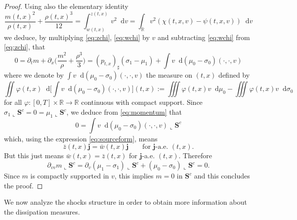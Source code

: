 \documentclass[11pt, twoside, reqno]{amsart}
\theoremstyle{definition}
\theoremstyle{remark}
\numberwithin{equation}{section}
\newcommand*\dif{\mathop{}\!\mathrm{d}}
\begin{document}
\begin{proof}
Using also the elementary identity 
$$
\frac{m(t,x)^2}{\rho(t,x)} + \frac{\rho(t,x)^3}{12} = \int_{w(t,x)}^{z(t,x)}v^2 \dif v = \int_{\mathbb R} v^2 (\chi(t,x,v) - \psi(t,x,v)) \dif v
$$
we deduce, by multiplying \eqref{eq:zchi}, \eqref{eq:wchi} by $v$ and subtracting \eqref{eq:wchi} from \eqref{eq:zchi}, that 
\begin{equation}\label{eq:momentum}
    0 = \partial_t m + \partial_x \Big(\frac{m^2}{\rho} + \frac{\rho^3}{3}\Big) = (p_{t,x})_\sharp (\sigma_1 - \mu_1) + \int  v \dif (\mu_0- \sigma_0)(\cdot,\cdot, v)
\end{equation}
where  we denote by $\int  v \dif (\mu_0- \sigma_0)(\cdot,\cdot, v)$ the measure on $(t,x)$ defined by 
$$
\iint \varphi(t,x) \dif \Big[ \int  v \dif (\mu_0- \sigma_0)(\cdot,\cdot, v) \Big](t,x) := \iiint \varphi(t,x) v \dif \mu_0 - \iiint \varphi(t,x) v \dif \sigma_0
$$
for all $\varphi:[0,T] \times \mathbb R \to \mathbb R$ continuous with compact support.
Since $\sigma_1 \llcorner\mathbf S^c = 0 = \mu_1 \llcorner \mathbf S^c$, we deduce from \eqref{eq:momentum} that
\begin{equation}
   0 =  \int  v \dif (\mu_0- \sigma_0)(\cdot,\cdot, v) \llcorner \mathbf S^c 
\end{equation}
which, using the expression \eqref{eq:sourceform}, means
\begin{equation}
    \bar z(t,x)  \mathbf j =  \bar w(t,x)\mathbf j \qquad \text{for $\mathbf j$-a.e. $(t,x)$.}
\end{equation}
But this just means $\bar w(t,x) = \bar z(t,x)$ for $\mathbf j$-a.e. $(t,x)$. Therefore 
$$
\partial_{vv} m\llcorner \mathbf S^c = \partial_v (\mu_1 - \sigma_1)\llcorner \mathbf S^c  + (\mu_0 - \sigma_0)\llcorner \mathbf S^c = 0.
$$
Since $m$ is compactly supported in $v$, this implies $m = 0$ in $\mathbf S^c$ and this concludes the proof.
\end{proof}
We now analyze the shocks structure in order to obtain more information about the dissipation measures. 
\end{document}
